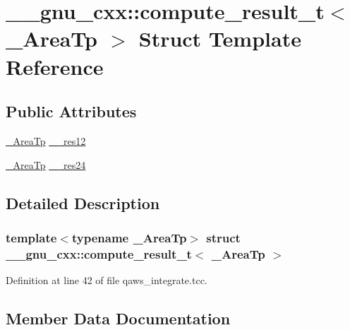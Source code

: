 \hypertarget{struct____gnu__cxx_1_1compute__result__t}{}\section{\+\_\+\+\_\+gnu\+\_\+cxx\+:\+:compute\+\_\+result\+\_\+t$<$ \+\_\+\+Area\+Tp $>$ Struct Template Reference}
\label{struct____gnu__cxx_1_1compute__result__t}
\subsection*{Public Attributes}
\begin{DoxyCompactItemize}
\item 
\hyperlink{namespace____gnu__cxx_ae97a51b75e19c30f48d27fac4664de6e}{\+\_\+\+Area\+Tp} \hyperlink{struct____gnu__cxx_1_1compute__result__t_ad3101c45e2d9913e21b87224c9ac617c}{\+\_\+\+\_\+res12}
\item 
\hyperlink{namespace____gnu__cxx_ae97a51b75e19c30f48d27fac4664de6e}{\+\_\+\+Area\+Tp} \hyperlink{struct____gnu__cxx_1_1compute__result__t_a9df5b5d8aee2913b9214d1d5c0b409ce}{\+\_\+\+\_\+res24}
\end{DoxyCompactItemize}


\subsection{Detailed Description}
\subsubsection*{template$<$typename \+\_\+\+Area\+Tp$>$\newline
struct \+\_\+\+\_\+gnu\+\_\+cxx\+::compute\+\_\+result\+\_\+t$<$ \+\_\+\+Area\+Tp $>$}



Definition at line 42 of file qaws\+\_\+integrate.\+tcc.



\subsection{Member Data Documentation}
\mbox{\label{struct____gnu__cxx_1_1compute__result__t_ad3101c45e2d9913e21b87224c9ac617c}} 
